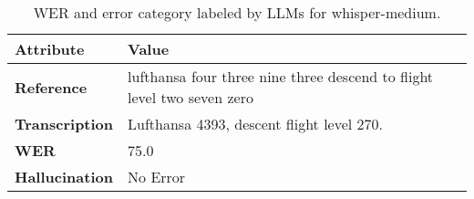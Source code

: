 
\begin{table}[h!]
\centering
\small
\renewcommand{\arraystretch}{1.3}
\begin{tabularx}{\linewidth}{l X} %
\hline
\textbf{Attribute} & \textbf{Value} \\
\hline
\textbf{Reference} & lufthansa four three nine three descend to flight level two seven zero \\
\textbf{Transcription} & Lufthansa 4393, descent flight level 270. \\
\textbf{WER} & 75.0 \\
\textbf{Hallucination} & No Error \\
\hline
\end{tabularx}
\caption{WER and error category labeled by LLMs for whisper-medium.}
\label{tab:wer_vs_hallucination}
\end{table}